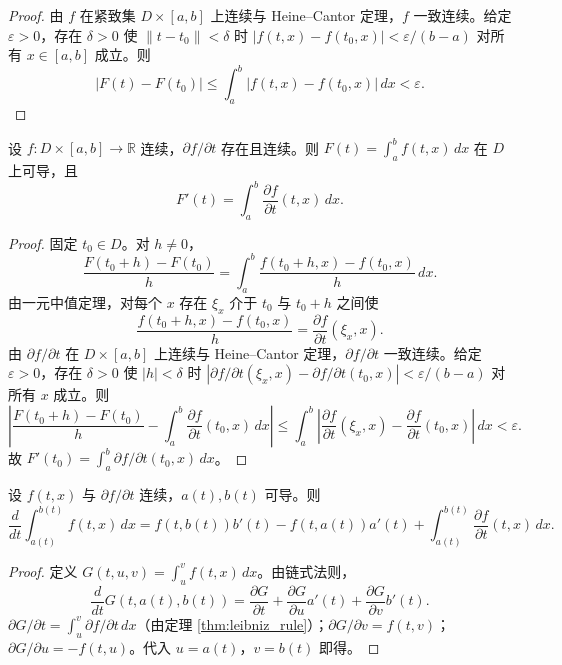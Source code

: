\begin{proof}
由 $f$ 在紧致集 $D \times [a, b]$ 上连续与 Heine--Cantor 定理，$f$ 一致连续。给定 $\varepsilon > 0$，存在 $\delta > 0$ 使 $\|t - t_0\| < \delta$ 时 $|f(t, x) - f(t_0, x)| < \varepsilon / (b - a)$ 对所有 $x \in [a, b]$ 成立。则
\[
|F(t) - F(t_0)| \le \int_a^b |f(t, x) - f(t_0, x)| \, dx < \varepsilon.
\]
\end{proof}

\begin{theorem}\label{thm:leibniz_rule}
设 $f: D \times [a, b] \to \mathbb{R}$ 连续，$\partial f/\partial t$ 存在且连续。则 $F(t) = \int_a^b f(t, x) \, dx$ 在 $D$ 上可导，且
\[
F'(t) = \int_a^b \frac{\partial f}{\partial t}(t, x) \, dx.
\]
\end{theorem}

\begin{proof}
固定 $t_0 \in D$。对 $h \neq 0$，
\[
\frac{F(t_0 + h) - F(t_0)}{h} = \int_a^b \frac{f(t_0 + h, x) - f(t_0, x)}{h} \, dx.
\]
由一元中值定理，对每个 $x$ 存在 $\xi_x$ 介于 $t_0$ 与 $t_0 + h$ 之间使
\[
\frac{f(t_0 + h, x) - f(t_0, x)}{h} = \frac{\partial f}{\partial t}(\xi_x, x).
\]
由 $\partial f/\partial t$ 在 $D \times [a, b]$ 上连续与 Heine--Cantor 定理，$\partial f/\partial t$ 一致连续。给定 $\varepsilon > 0$，存在 $\delta > 0$ 使 $|h| < \delta$ 时 $|\partial f/\partial t(\xi_x, x) - \partial f/\partial t(t_0, x)| < \varepsilon/(b - a)$ 对所有 $x$ 成立。则
\[
\left| \frac{F(t_0 + h) - F(t_0)}{h} - \int_a^b \frac{\partial f}{\partial t}(t_0, x) \, dx \right| \le \int_a^b \left| \frac{\partial f}{\partial t}(\xi_x, x) - \frac{\partial f}{\partial t}(t_0, x) \right| \, dx < \varepsilon.
\]
故 $F'(t_0) = \int_a^b \partial f/\partial t(t_0, x) \, dx$。
\end{proof}

\begin{corollary}\label{cor:leibniz_variable_limits}
设 $f(t, x)$ 与 $\partial f/\partial t$ 连续，$a(t), b(t)$ 可导。则
\[
\frac{d}{dt} \int_{a(t)}^{b(t)} f(t, x) \, dx = f(t, b(t)) b'(t) - f(t, a(t)) a'(t) + \int_{a(t)}^{b(t)} \frac{\partial f}{\partial t}(t, x) \, dx.
\]
\end{corollary}

\begin{proof}
定义 $G(t, u, v) = \int_u^v f(t, x) \, dx$。由链式法则，
\[
\frac{d}{dt} G(t, a(t), b(t)) = \frac{\partial G}{\partial t} + \frac{\partial G}{\partial u} a'(t) + \frac{\partial G}{\partial v} b'(t).
\]
$\partial G/\partial t = \int_u^v \partial f/\partial t \, dx$（由定理 \ref{thm:leibniz_rule}）；$\partial G/\partial v = f(t, v)$；$\partial G/\partial u = -f(t, u)$。代入 $u = a(t)$，$v = b(t)$ 即得。
\end{proof}

